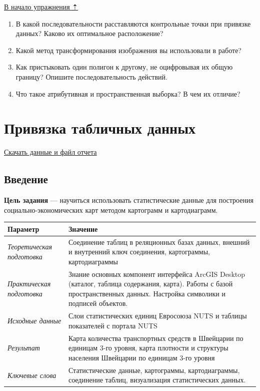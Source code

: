 \documentclass[]{book}
\theoremstyle{definition}
\theoremstyle{definition}
\theoremstyle{definition}
\theoremstyle{remark}
\begin{document}
\protect\hyperlink{map-ref-economic}{В начало упражнения ⇡}

\begin{enumerate}
\def\labelenumi{\arabic{enumi}.}
\item
  В какой последовательности расставляются контрольные точки при
  привязке данных? Каково их оптимальное расположение?
\item
  Какой метод трансформирования изображения вы использовали в работе?
\item
  Как пристыковать один полигон к другому, не оцифровывая их общую
  границу? Опишите последовательность действий.
\item
  Что такое атрибутивная и пространственная выборка? В чем их отличие?
\end{enumerate}

\hypertarget{stat-map-economic}{%
\chapter{Привязка табличных данных}\label{stat-map-economic}}

\href{http://autolab.geogr.msu.ru/gis/data/Ex08.zip}{Скачать данные и
файл отчета}

\hypertarget{stat-map-economic-intro}{%
\section{Введение}\label{stat-map-economic-intro}}

\textbf{Цель задания} --- научиться использовать статистические данные
для построения социально-экономических карт методом картограмм и
картодиаграмм.

\begin{longtable}[]{@{}ll@{}}
\toprule
Параметр & Значение\tabularnewline
\midrule
\endhead
\emph{Теоретическая подготовка} & Соединение таблиц в реляционных базах
данных, внешний и внутренний ключ соединения, картограммы,
картодиаграммы\tabularnewline
\emph{Практическая подготовка} & Знание основных компонент интерфейса
ArcGIS Desktop (каталог, таблица содержания, карта). Работы с базой
пространственных данных. Настройка символики и подписей
объектов.\tabularnewline
\emph{Исходные данные} & Слои статистических единиц Евросоюза NUTS и
таблицы показателей с портала NUTS\tabularnewline
\emph{Результат} & Карта количества транспортных средств в Швейцарии по
единицам 3-го уровня, карта плотности и структуры населения Швейцарии по
единицам 3-го уровня\tabularnewline
\emph{Ключевые слова} & Статистические данные, картограммы,
картодиаграммы, соединение таблиц, визуализация статистических
данных.\tabularnewline
\bottomrule
\end{longtable}
\end{document}

